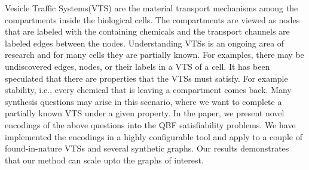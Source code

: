 Vesicle Traffic Systems(VTS) are the material transport mechanisms
among the compartments inside the biological cells.
%
The compartments are viewed as nodes that are labeled with the containing
chemicals and the transport channels are labeled edges between the
nodes.
%
Understanding VTSs is an ongoing area of research and for many cells
they are partially known.
%
For examples, there may be undiscovered edges, nodes, or their labels
in a VTS of a cell.
%
It has been speculated that there are properties that the VTSs must satisfy.
%
For example stability, i.e., every chemical that is leaving a compartment comes back.
%
Many synthesis questions may arise in this scenario, where we want
to complete a partially known VTS under a given property.
%
In the paper, we present novel encodings of the above questions
into the QBF satisfiability problems.
%
We have implemented the encodings in a highly configurable tool
and  apply to a couple of found-in-nature VTSs and 
several synthetic graphs.
%
Our results demonstrates that our method can scale upto the
graphs of interest.
%


